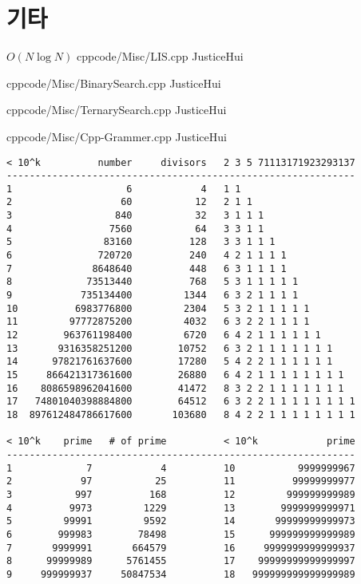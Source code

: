 \documentclass[landscape, 8pt, a4paper, twocolumn]{extarticle} %
\begin{document}
\section{기타}

{}{$O(N \log N)$}
{cpp}{code/Misc/LIS.cpp}
{JusticeHui}

{}{}
{cpp}{code/Misc/BinarySearch.cpp}
{JusticeHui}

{}{}
{cpp}{code/Misc/TernarySearch.cpp}
{JusticeHui}

{}{}
{cpp}{code/Misc/Cpp-Grammer.cpp}
{JusticeHui}

\begin{verbatim}
< 10^k          number     divisors   2 3 5 71113171923293137
-------------------------------------------------------------
1                    6            4   1 1
2                   60           12   2 1 1
3                  840           32   3 1 1 1
4                 7560           64   3 3 1 1
5                83160          128   3 3 1 1 1
6               720720          240   4 2 1 1 1 1
7              8648640          448   6 3 1 1 1 1
8             73513440          768   5 3 1 1 1 1 1
9            735134400         1344   6 3 2 1 1 1 1
10          6983776800         2304   5 3 2 1 1 1 1 1
11         97772875200         4032   6 3 2 2 1 1 1 1
12        963761198400         6720   6 4 2 1 1 1 1 1 1
13       9316358251200        10752   6 3 2 1 1 1 1 1 1 1
14      97821761637600        17280   5 4 2 2 1 1 1 1 1 1
15     866421317361600        26880   6 4 2 1 1 1 1 1 1 1 1
16    8086598962041600        41472   8 3 2 2 1 1 1 1 1 1 1
17   74801040398884800        64512   6 3 2 2 1 1 1 1 1 1 1 1
18  897612484786617600       103680   8 4 2 2 1 1 1 1 1 1 1 1

< 10^k    prime   # of prime          < 10^k            prime
-------------------------------------------------------------
1             7            4          10           9999999967
2            97           25          11          99999999977
3           997          168          12         999999999989
4          9973         1229          13        9999999999971
5         99991         9592          14       99999999999973
6        999983        78498          15      999999999999989
7       9999991       664579          16     9999999999999937
8      99999989      5761455          17    99999999999999997
9     999999937     50847534          18   999999999999999989
\end{verbatim}
\end{document}
